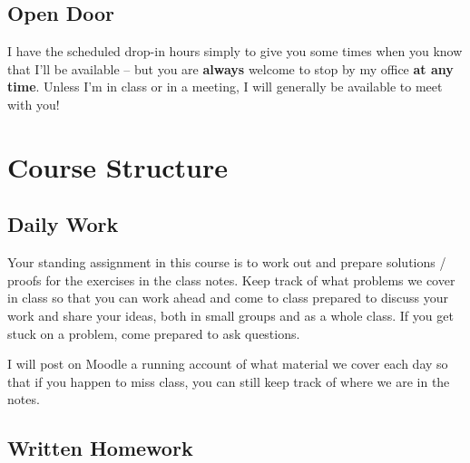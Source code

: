 \documentclass[
  letterpaper,
  DIV=11,
  numbers=noendperiod]{scrreprt}
\begin{document}
\section{Open Door}\label{open-door}

I have the scheduled drop-in hours simply to give you some times when
you know that I'll be available -- but you are \textbf{always} welcome
to stop by my office \textbf{at any time}. Unless I'm in class or in a
meeting, I will generally be available to meet with you!


\chapter{Course Structure}\label{course-structure}

\section{Daily Work}\label{daily-work}

Your standing assignment in this course is to work out and prepare
solutions / proofs for the exercises in the class notes. Keep track of
what problems we cover in class so that you can work ahead and come to
class prepared to discuss your work and share your ideas, both in small
groups and as a whole class. If you get stuck on a problem, come
prepared to ask questions.

\begin{tcolorbox}[enhanced jigsaw, breakable, rightrule=.15mm, left=2mm, arc=.35mm, bottomrule=.15mm, colframe=quarto-callout-note-color-frame, toprule=.15mm, leftrule=.75mm, opacityback=0, colback=white]
\begin{minipage}[t]{5.5mm}
\textcolor{quarto-callout-note-color}{\faInfo}
\end{minipage}%
\begin{minipage}[t]{\textwidth - 5.5mm}

I will post on Moodle a running account of what material we cover each
day so that if you happen to miss class, you can still keep track of
where we are in the notes.

\end{minipage}%
\end{tcolorbox}

\section{Written Homework}\label{written-homework}
\end{document}
